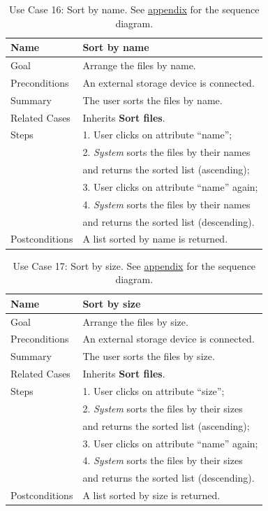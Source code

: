 \begin{table}[h!]
\centering
\begin{tabular}{|l|l|}
\hline
Name & Sort by name\\ \hline
Goal & Arrange the files by name.\\ \hline
Preconditions & An external storage device is connected. \\ \hline
Summary & The user sorts the files by name.\\ \hline
Related Cases & Inherits \textbf{Sort files}. \\ \hline
Steps &  1. User clicks on attribute ``name''; \\
      &  2. \textit{System} sorts the files by their names
      \\ & and returns the sorted list (ascending); \\
      &  3. User clicks on attribute ``name'' again; \\
      &  4. \textit{System} sorts the files by their names
      \\ & and returns the sorted list (descending).
        \\ \hline
Postconditions & A list sorted by name is returned.
\\ \hline
\end{tabular}
\caption{Use Case 16: Sort by name. See \hyperref[fig:req_seq7]{appendix} for the sequence diagram.}
\label{tab:UC16}
\end{table}

\clearpage

\begin{table}[t]
\centering
\begin{tabular}{|l|l|}
\hline
Name & Sort by size\\ \hline
Goal & Arrange the files by size.\\ \hline
Preconditions & An external storage device is connected. \\ \hline
Summary & The user sorts the files by size.\\ \hline
Related Cases & Inherits \textbf{Sort files}. \\ \hline
Steps &  1. User clicks on attribute ``size''; \\
      &  2. \textit{System} sorts the files by their sizes
      \\ & and returns the sorted list (ascending); \\
      &  3. User clicks on attribute ``name'' again; \\
      &  4. \textit{System} sorts the files by their sizes
      \\ & and returns the sorted list (descending).
        \\ \hline
Postconditions & A list sorted by size is returned.
\\ \hline
\end{tabular}
\caption{Use Case 17: Sort by size. See \hyperref[fig:req_seq7]{appendix} for the sequence diagram.}
\label{tab:UC17}
\end{table}

